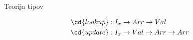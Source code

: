 \begin{frame}{Teorija tipov}

\begin{whitemath}
    
    \begin{align*}
        \cd{lookup} &: I_x \rightarrow Arr \rightarrow Val \\
        \cd{update} &: I_x \rightarrow Val \rightarrow Arr \rightarrow Arr
    \end{align*}
\end{whitemath}

\end{frame}
